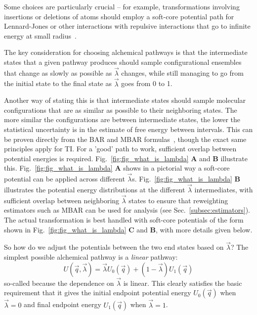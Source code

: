 \documentclass[9pt,bestpractices]{livecoms}
\begin{document}
Some choices are particularly crucial -- for example, transformations involving insertions or deletions of atoms should employ a soft-core potential path for Lennard-Jones or other interactions with repulsive interactions that go to infinite energy at small radius~\cite{beutler1994avoiding, beutler1994molecular,gapsys2012new}.

The key consideration for choosing alchemical pathways is that the intermediate states that a given pathway produces should sample configurational ensembles that change as slowly as possible as $\vec{\lambda}$ changes, while still managing to go from the initial state to the final state as $\vec{\lambda}$ goes from 0 to 1.

Another way of stating this is that intermediate states should sample molecular configurations that are as similar as possible to their neighboring states. The more similar the configurations are between intermediate states, the lower the statistical uncertainty is in the estimate of free energy between intervals. This can be proven directly from the BAR and MBAR formulas~\cite{bennett1976efficient,klimovich2015guidelines}, though the exact same principles apply for TI. For a 'good' path to work, sufficient overlap between potential energies is required. Fig.~\ref{fig:fig_what_is_lambda} \textbf{A} and \textbf{B} illustrate this. Fig.~\ref{fig:fig_what_is_lambda} \textbf{A} shows in a pictorial way a soft-core potential can be applied across different $\vec{\lambda}$s. Fig.~\ref{fig:fig_what_is_lambda} \textbf{B} illustrates the potential energy distributions at the different $\vec{\lambda}$ intermediates, with sufficient overlap between neighboring $\vec{\lambda}$ states to ensure that reweighting estimators such as MBAR can be used for analysis (see Sec.~\ref{subsec:estimators}). The actual transformation is best handled with soft-core potentials of the form shown in Fig.~\ref{fig:fig_what_is_lambda} \textbf{C} and \textbf{B}, with more details given below. 

So how do we adjust the potentials between the two end states based on $\vec{\lambda}$? The simplest possible alchemical pathway is a \textit{linear} pathway:
\begin{equation}
U(\vec{q},\vec{\lambda}) = \vec{\lambda} U_0(\vec{q}) + (1-\vec{\lambda})U_1(\vec{q})   
\end{equation}
%
so-called because the dependence on $\vec{\lambda}$ is linear. This clearly satisfies the basic requirement that it gives the initial endpoint potential energy $U_0(\vec{q})$ when $\vec{\lambda}=0$ and final endpoint energy $U_1(\vec{q})$ when $\vec{\lambda}=1$. 
\end{document}
